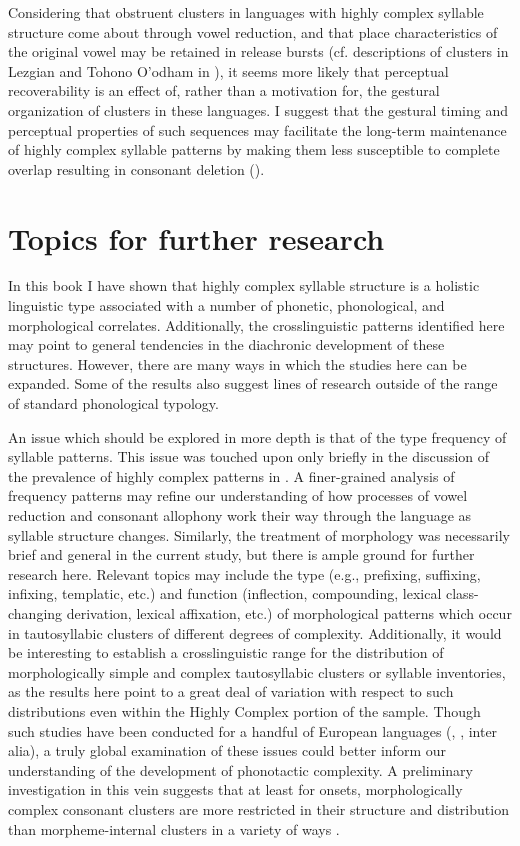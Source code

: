   Considering that obstruent clusters in languages with highly complex syllable structure come about through vowel reduction, and that place characteristics of the original vowel may be retained in release bursts (cf. descriptions of clusters in Lezgian and Tohono O’odham in ), it seems more likely that perceptual recoverability is an effect of, rather than a motivation for, the gestural organization of clusters in these languages. I suggest that the gestural timing and perceptual properties of such sequences may facilitate the long-term maintenance of highly complex syllable patterns by making them less susceptible to complete overlap resulting in consonant deletion (\citealt{BrowmanGoldstein1990}).

\section{Topics for further research}\label{sec:8.6}

  In this book I have shown that highly complex syllable structure is a holistic linguistic type associated with a number of phonetic, phonological, and morphological correlates. Additionally, the crosslinguistic patterns identified here may point to general tendencies in the diachronic development of these structures. However, there are many ways in which the studies here can be expanded. Some of the results also suggest lines of research outside of the range of standard phonological typology.

  An issue which should be explored in more depth is that of the type frequency of syllable patterns. This issue was touched upon only briefly in the discussion of the prevalence of highly complex patterns in . A finer-grained analysis of frequency patterns may refine our understanding of how processes of vowel reduction and consonant allophony work their way through the language as syllable structure changes. Similarly, the treatment of morphology was necessarily brief and general in the current study, but there is ample ground for further research here. Relevant topics may include the type (e.g., prefixing, suffixing, infixing, templatic, etc.) and function (inflection, compounding, lexical class-changing derivation, lexical affixation, etc.) of morphological patterns which occur in tautosyllabic clusters of different degrees of complexity. Additionally, it would be interesting to establish a crosslinguistic range for the distribution of morphologically simple and complex tautosyllabic clusters or syllable inventories, as the results here point to a great deal of variation with respect to such distributions even within the Highly Complex portion of the sample. Though such studies have been conducted for a handful of European languages (\citealt{DresslerDziubalska-Kołaczyk2006}, \citealt{DresslerEtAl2010}, inter alia), a truly global examination of these issues could better inform our understanding of the development of phonotactic complexity. A preliminary investigation in this vein suggests that at least for onsets, morphologically complex consonant clusters are more restricted in their structure and distribution than morpheme-internal clusters in a variety of ways \citep{Easterday2019}.

